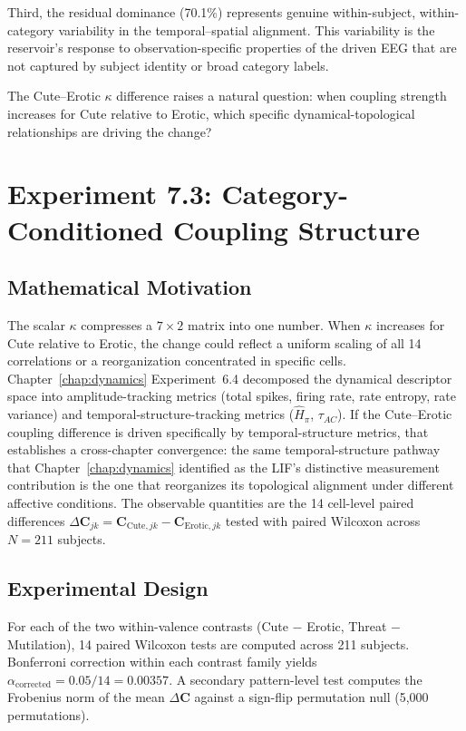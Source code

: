 Third, the residual dominance (70.1\%) represents genuine within-subject, within-category variability in the temporal--spatial alignment. This variability is the reservoir's response to observation-specific properties of the driven EEG that are not captured by subject identity or broad category labels.

The Cute--Erotic $\kappa$ difference raises a natural question: when coupling strength increases for Cute relative to Erotic, which specific dynamical-topological relationships are driving the change?


\section{Experiment 7.3: Category-Conditioned Coupling Structure}
\label{sec:exp7_category}

\subsection{Mathematical Motivation}

The scalar $\kappa$ compresses a $7 \times 2$ matrix into one number. When $\kappa$ increases for Cute relative to Erotic, the change could reflect a uniform scaling of all 14 correlations or a reorganization concentrated in specific cells. Chapter~\ref{chap:dynamics} Experiment~6.4 decomposed the dynamical descriptor space into amplitude-tracking metrics (total spikes, firing rate, rate entropy, rate variance) and temporal-structure-tracking metrics ($\hat{H}_\pi$, $\tau_{AC}$). If the Cute--Erotic coupling difference is driven specifically by temporal-structure metrics, that establishes a cross-chapter convergence: the same temporal-structure pathway that Chapter~\ref{chap:dynamics} identified as the LIF's distinctive measurement contribution is the one that reorganizes its topological alignment under different affective conditions. The observable quantities are the 14 cell-level paired differences $\Delta\mathbf{C}_{jk} = \mathbf{C}_{\text{Cute},jk} - \mathbf{C}_{\text{Erotic},jk}$ tested with paired Wilcoxon across $N = 211$ subjects.

\subsection{Experimental Design}

For each of the two within-valence contrasts (Cute $-$ Erotic, Threat $-$ Mutilation), 14 paired Wilcoxon tests are computed across 211 subjects. Bonferroni correction within each contrast family yields $\alpha_{\text{corrected}} = 0.05/14 = 0.00357$. A secondary pattern-level test computes the Frobenius norm of the mean $\Delta\mathbf{C}$ against a sign-flip permutation null (5,000 permutations).

